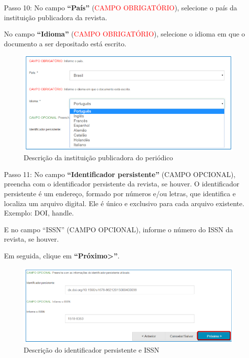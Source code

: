 \documentclass[12pt,hidelinks]{article}
\begin{document}
    Passo 10: No campo \textbf{“País”} (\textcolor{red}{CAMPO OBRIGATÓRIO}), selecione o país da instituição publicadora da revista.
    
    \singlespacing
    
    No campo \textbf{“Idioma”} (\textcolor{red}{CAMPO OBRIGATÓRIO}), selecione o idioma em que o documento a ser depositado está escrito.
    
    \begin{figure}[!htp]
                \centering
                \includegraphics[scale=0.8]{figura/Figura149.png}
                \caption{Descrição da instituição publicadora do periódico}
            \label{Rotulo}
        \end{figure}
    
    Passo 11: No campo \textbf{“Identificador persistente”} (\textcolor{applegreen}{CAMPO OPCIONAL}), preencha com o identificador persistente da revista, se houver. O identificador persistente é um endereço, formado por números e/ou letras, que identifica e localiza um arquivo digital. Ele é único e exclusivo para cada arquivo existente. Exemplo: DOI, handle.

\newpage
    
    E no campo “ISSN” (\textcolor{applegreen}{CAMPO OPCIONAL}), informe o número do ISSN da revista, se houver.
    
    Em seguida, clique em \textbf{“Próximo>”}.
    
    \begin{figure}[!htp]
                \centering
                \includegraphics[scale=0.8]{figura/Figura150.png}
                \caption{Descrição do identificador persistente e ISSN}
            \label{Rotulo}
        \end{figure}
    
\end{document}
